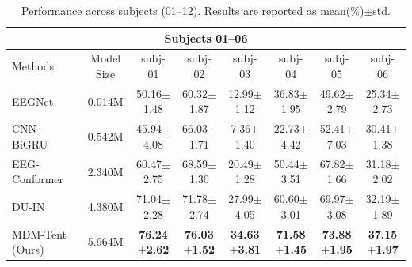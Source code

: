 \documentclass{article}
\begin{document}
\begin{table}[!ht]
    \centering
    \caption{Performance across subjects (01--12). Results are reported as mean(\%)$\pm$std.}
    \label{performance}

    \begin{tabular}{l c c c c c c c}
    \toprule
    \multicolumn{8}{c}{\textbf{Subjects 01--06}} \\
    \midrule
    Methods & Model Size & subj-01 & subj-02 & subj-03 & subj-04 & subj-05 & subj-06 \\
    \midrule
    EEGNet~\cite{lawhern2018eegnet}        & 0.014M & 50.16$\pm$1.48 & 60.32$\pm$1.87 & 12.99$\pm$1.12 & 36.83$\pm$1.95 & 49.62$\pm$2.79 & 25.34$\pm$2.73 \\
    CNN-BiGRU~\cite{moses2021neuroprosthesis}     & 0.542M & 45.94$\pm$4.08 & 66.03$\pm$1.71 &  7.36$\pm$1.40 & 22.73$\pm$4.42 & 52.41$\pm$7.03 & 30.41$\pm$1.38 \\
    EEG-Conformer~\cite{song2022eeg} & 2.340M & 60.47$\pm$2.75 & 68.59$\pm$1.30 & 20.49$\pm$1.28 & 50.44$\pm$3.51 & 67.82$\pm$1.66 & 31.18$\pm$2.02 \\
    DU-IN~\cite{zheng2024discrete}         & 4.380M & 71.04$\pm$2.28 & 71.78$\pm$2.74 & 27.99$\pm$4.05 & 60.60$\pm$3.01 & 69.97$\pm$3.08 & 32.19$\pm$1.89 \\
    MDM-Tent (Ours)        & 5.964M & \textbf{76.24$\pm$2.62} & \textbf{76.03$\pm$1.52} & \textbf{34.63$\pm$3.81} & \textbf{71.58$\pm$1.45} & \textbf{73.88$\pm$1.95} & \textbf{37.15$\pm$1.97} \\
    \bottomrule
    \end{tabular}

    \vspace{0.6em}


\end{table}
\end{document}
